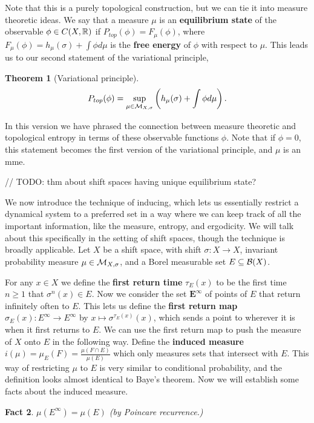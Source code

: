 \documentclass[11pt, reqno]{amsart}
\theoremstyle{plain}
\newtheorem{thm}{Theorem}[section]
\numberwithin{thm}{subsection}
\newtheorem{fact}[thm]{Fact}
\theoremstyle{definition}
\begin{document}
Note that this is a purely topological construction, but we can tie it into measure theoretic ideas. We say that a measure $\mu$ is an \textbf{equilibrium state} of the observable $\phi \in C(X, \mathbb{R})$ if $P_{top}(\phi) = F_\mu(\phi)$, where $F_\mu(\phi) = h_\mu(\sigma) + \int\phi d\mu$ is the \textbf{free energy} of $\phi$ with respect to $\mu$. This leads us to our second statement of the variational principle, 

\begin{thm}[Variational principle]
  $$P_{top}(\phi) = \sup_{\mu \in \mathcal{M}_{X,\sigma}}\left(h_\mu(\sigma)+\int \phi d\mu\right).$$
\end{thm}
In this version we have phrased the connection between measure theoretic and topological entropy in terms of these observable functions $\phi$. Note that if $\phi = 0$, this statement becomes the first version of the variational principle, and $\mu$ is an mme. 

// TODO: thm about shift spaces having unique equilibrium state?

We now introduce the technique of inducing, which lets us essentially restrict a dynamical system to a preferred set in a way where we can keep track of all the important information, like the measure, entropy, and ergodicity. We will talk about this specifically in the setting of shift spaces, though the technique is broadly applicable. Let $X$ be a shift space, with shift $\sigma: X \rightarrow X$, invariant probability measure $\mu \in \mathcal{M}_{X, \sigma}$, and a Borel measurable set $E \subseteq \mathcal{B}(X)$. 

For any $x \in X$ we define the \textbf{first return time} $\tau_E(x)$ to be the first time $n \ge 1$ that $\sigma^n(x) \in E$. Now we consider the set $\boldsymbol{E^\infty}$ of points of $E$ that return infinitely often to $E$. This lets us define the \textbf{first return map} $\sigma_E(x): E^\infty \rightarrow E^\infty$ by $x \mapsto \sigma^{\tau_E(x)}(x)$, which sends a point to wherever it is when it first returns to $E$. We can use the first return map to push the measure of $X$ onto $E$ in the following way. Define the \textbf{induced measure} $i(\mu) = \mu_E(F) = \frac{\mu(F \cap E)}{\mu(E)}$ which only measures sets that intersect with $E$. This way of restricting $\mu$ to $E$ is very similar to conditional probability, and the definition looks almost identical to Baye's theorem. Now we will establish some facts about the induced measure. 

\begin{fact}
  $\mu(E^\infty) = \mu(E)$ (by Poincare recurrence.)
\end{fact}
\end{document}
